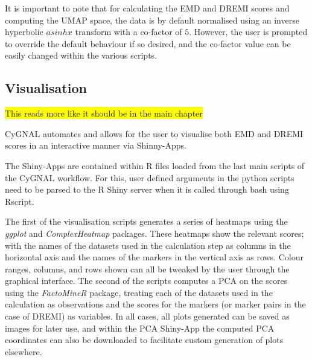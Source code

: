 It is important to note that for calculating the EMD and DREMI scores and computing the UMAP space, the data is by default normalised using an inverse hyperbolic \(asinh x\) transform with a co-factor of \(5\). However, the user is prompted to override the default behaviour if so desired, and the co-factor value can be easily changed within the various scripts.

\subsection{Visualisation}

\colorbox{yellow}{This reads more like it should be in the main chapter}

CyGNAL  automates and allows for the user to visualise both EMD and DREMI scores in an interactive manner via Shinny-Apps\cite{noauthor_rstudioshiny_2021}. 

The Shiny-Apps are contained within R files loaded from the last main scripts of the CyGNAL workflow. For this, user defined arguments in the python scripts need to be parsed to the R Shiny server when it is called through bash using Rscript.

The first of the visualisation scripts generates a series of heatmaps using the \emph{ggplot}\cite{wickham_ggplot2_2009} and \emph{ComplexHeatmap}\cite{gu_complexheatmap_2021} packages. These heatmaps show the relevant scores; with the names of the datasets used in the calculation step as columns in the horizontal axis and the names of the markers in the vertical axis as rows. Colour ranges, columns, and rows shown can all be tweaked by the user through the graphical interface. 
The second of the scripts computes a PCA on the scores using the \emph{FactoMineR} package\cite{le_factominer_2008}, treating each of the datasets used in the calculation as observations and the scores for the markers (or marker pairs in the case of DREMI) as variables. In all cases, all plots generated can be saved as images for later use, and within the PCA Shiny-App the computed PCA coordinates can also be downloaded to facilitate custom generation of plots elsewhere.



